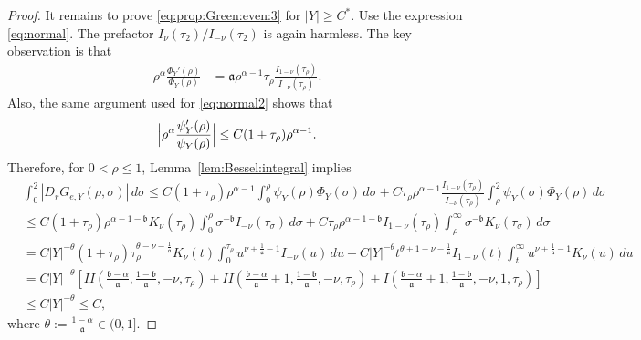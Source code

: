 \documentclass[12pt]{amsart}
\begin{document}
\begin{proof}

It remains to prove \eqref{eq:prop:Green:even:3} for $|Y|\ge C^*$. Use the expression \eqref{eq:normal}. The prefactor $I_{\nu}( \tau_2 )/I_{-\nu}( \tau_2 )$ is again harmless. The key observation is that
\begin{align*}
\rho^\alpha\frac{\Phi_{Y}'(\rho)}{\Phi_{Y}(\rho)}
&= \mathfrak a \rho^{\alpha-1}\tau_\rho \frac{I_{1-\nu}(\tau_\rho)}{I_{-\nu}(\tau_\rho)}.
\end{align*}
Also, the same argument used for \eqref{eq:normal2} shows that
\begin{equation*}
    \Bigl|\rho^\alpha \frac{\psi_Y'(\rho)}{\psi_Y(\rho)} \Bigr| \le C (1+\tau_\rho) \rho^{\alpha-1}.
\end{equation*}
Therefore, for $0<\rho\le 1$, Lemma~\ref{lem:Bessel:integral} implies
\begin{align*}
    &\int_0^2 |D_r G_{e,Y}(\rho,\sigma)| \, d\sigma
    \le C(1+\tau_\rho) \rho^{\alpha-1} \int_0^\rho \psi_Y(\rho) \Phi_Y(\sigma) \, d\sigma + C\tau_\rho \rho^{\alpha-1} \frac{I_{1-\nu}(\tau_\rho)}{I_{-\nu}(\tau_\rho)} \int_\rho^2 \psi_Y(\sigma) \Phi_Y(\rho) \, d\sigma \\
    &\le C (1+\tau_\rho) \rho^{\alpha-1-\mathfrak b} K_\nu(\tau_\rho) \int_0^\rho \sigma^{-\mathfrak b} I_{-\nu}(\tau_\sigma) \, d\sigma + C\tau_\rho \rho^{\alpha-1-\mathfrak b} I_{1-\nu}(\tau_\rho) \int_\rho^\infty \sigma^{-\mathfrak b} K_\nu(\tau_\sigma) \, d\sigma\\
    &= C |Y|^{-\theta} (1+\tau_\rho) \tau_\rho^{\theta-\nu-\frac{1}{\mathfrak a}} K_\nu(t) \int_0^{\tau_\rho} u^{\nu+\frac{1}{\mathfrak a}-1}I_{-\nu}(u) \, du + C |Y|^{-\theta} t^{\theta+1-\nu-\frac{1}{\mathfrak a}} I_{1-\nu}(t) \int_t^\infty u^{\nu+\frac{1}{\mathfrak a}-1} K_\nu(u) \, du\\
    &= C |Y|^{-\theta} \left[ II\left( \frac{\mathfrak b - \alpha}{\mathfrak a}, \frac{1-\mathfrak b}{\mathfrak a},-\nu,\tau_\rho \right)  +  II\left( \frac{\mathfrak b - \alpha}{\mathfrak a}+1, \frac{1-\mathfrak b}{\mathfrak a},-\nu,\tau_\rho \right)    + I\left( \frac{\mathfrak b - \alpha}{\mathfrak a}+1, \frac{1-\mathfrak b}{\mathfrak a}, -\nu,1,\tau_\rho \right) \right]\\
    &\le C |Y|^{-\theta}\le C,
\end{align*}
where $\theta:= \frac{1-\alpha}{\mathfrak a}\in (0,1]$.





\end{proof}
\end{document}
